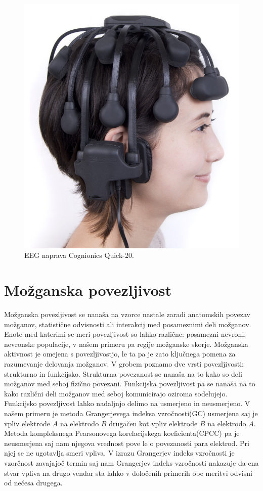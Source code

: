 \begin{figure}[h!]
    \begin{center}
    \includegraphics[width=0.5\linewidth]{slike/Cognionics Quick-20.png}
    \end{center}
    \caption[EEG naprava Cognionics Quick-20.]{EEG naprava Cognionics Quick-20. \cite{CognionicsQUICK20User}}
    \label{slika:quick_20}
    \end{figure}
\section{Možganska povezljivost}
Možganska povezljivost se nanaša na vzorce nastale zaradi anatomskih povezav možganov, statistične odvisnosti ali interakcij med posameznimi deli možganov.  Enote med katerimi se meri povezljivost so lahko različne: posamezni nevroni, nevronske populacije, v našem primeru pa regije možganske skorje. Možganska aktivnost je omejena s povezljivostjo, le ta pa je zato ključnega pomena za razumevanje delovanja možganov. V grobem poznamo dve vrsti povezljivosti: strukturno in funkcijsko. Strukturna povezanost se nanaša na to kako so deli možganov med seboj fizično povezani. Funkcijska povezljivost pa se nanaša na to kako različni deli možganov med seboj komunicirajo oziroma sodelujejo.\cite{spornsBrainConnectivity2007} Funkcijsko povezljivost lahko nadaljnjo delimo na usmerjeno in neusmerjeno. V našem primeru je metoda Grangerjevega indeksa vzročnosti(GC) usmerjena saj je vpliv elektrode $A$ na elektrodo $B$ drugačen kot vpliv elektrode $B$ na elektrodo $A$. Metoda kompleksnega Pearsonovega korelacijskega koeficienta(CPCC) pa je neusmerjena saj nam njegova vrednost pove le o povezanosti para elektrod. Pri njej se ne ugotavlja smeri vpliva.
V izrazu Grangerjev indeks vzročnosti je vzorčnost zavajajoč termin saj nam Grangerjev indeks vzročnosti nakazuje da ena stvar vpliva na drugo vendar sta lahko v določenih primerih obe meritvi odvisni od nečesa drugega. 
